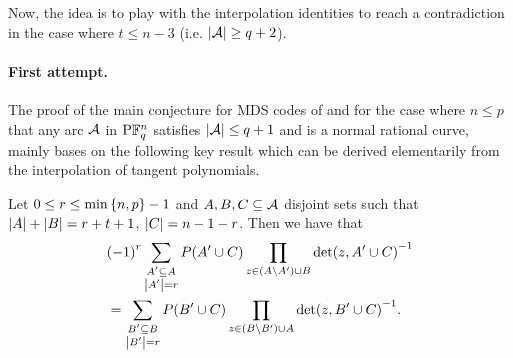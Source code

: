 Now, the idea is to play with the interpolation identities to reach a
contradiction in the case where $t\leq n-3$ (i.e. $\left\vert{\mathcal{A}}\right\vert\geq q+2$).

\paragraph{First attempt.} The proof of the main conjecture for MDS codes of  and  for the case where
$n\leq p$ that any arc $\mathcal{A}$ in $\P \field{q}^n$ satisfies $\left\vert{\mathcal{A}}\right\vert\leq q+1$ and is a normal rational
curve, mainly bases on the following key result which can be derived elementarily from the interpolation of tangent polynomials.

\begin{lemma}\label{mds-abc-lemma}
    Let $0\leq r\leq\min\set{n,p}-1$ and $A,B,C\subseteq \mathcal{A}$ disjoint sets such
    that $\left\vert{A}\right\vert+\left\vert{B}\right\vert=r+t+1$, $\left\vert{C}\right\vert=n-1-r$. Then we have that
    \begin{align*}
        &{(-1)}^r\sum_{\substack{A'\subseteq A\\ \left\vert{A'}\right\vert=r}}{P(A'\cup C)\prod_{z\in (A\setminus A')\cup B}{{\det(z,A'\cup C)}^{-1}}}\\
        &= \sum_{\substack{B'\subseteq B\\ \left\vert{B'}\right\vert=r}}{P(B'\cup C)\prod_{z\in (B\setminus B')\cup A}{{\det(z,B'\cup C)}^{-1}}}\text{.}
    \end{align*}
\end{lemma}

